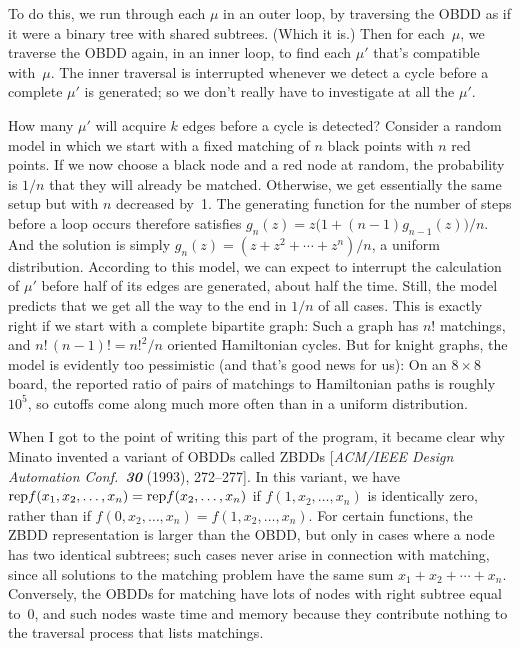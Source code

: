 To do this, we run through each $\mu$ in an outer loop, by traversing the OBDD
as if it were a binary tree with shared subtrees. (Which it is.) Then for
each~$\mu$, we traverse the OBDD again, in an inner loop, to find each $\mu'$
that's compatible with~$\mu$. The inner traversal is interrupted whenever we
detect a cycle before a complete $\mu'$ is generated; so we don't really have
to investigate at all the $\mu'$.

How many $\mu'$ will acquire $k$ edges before a cycle is detected? Consider a
random model in which we start with a fixed matching of $n$ black points with
$n$ red points. If we now choose a black node and a red node at random, the
probability is $1/n$ that they will already be matched. Otherwise, we get
essentially the same setup but with $n$ decreased by~1. The generating
function for the number of steps before a loop occurs therefore satisfies
$g_n(z)=z\bigl(1+(n-1)g_{n-1}(z)\bigr)/n$. And the solution is simply
$g_n(z)=(z+z^2+\cdots+z^n)/n$, a uniform distribution. According to this
model, we can expect to interrupt the calculation of $\mu'$ before half of its
edges are generated, about half the time. Still, the model predicts that we
get all the way to the end in $1/n$ of all cases. This is exactly right if we
start with a complete bipartite graph: Such a graph has $n!$ matchings, and
$n!\,(n-1)!=n!^2/n$ oriented Hamiltonian cycles. But for knight graphs, the
model is evidently too pessimistic (and that's good news for us): On an
$8\times8$ board, the reported ratio of pairs of matchings to Hamiltonian
paths is roughly $10^5$, so cutoffs come along much more often than in a
uniform distribution.

\fi

When I got to the point of writing this part of the program,
it became clear
why Minato invented a variant of OBDDs called ZBDDs [{\sl ACM/IEEE Design
Automation Conf.\ \bf30} (1993), 272--277]. In this variant, we have
$\hbox{rep} f(x_1,x_2,\ldots,x_n)=\hbox{rep} f(x_2,\ldots,x_n)$ if $f(1,x_2,\ldots,x_n)$
is identically zero, rather than if $f(0,x_2,\ldots,x_n)=f(1,x_2,\ldots,x_n)$.
For certain functions, the ZBDD representation is larger than the OBDD,
but only in cases where a node has two identical subtrees; such cases never
arise in connection with matching, since all solutions to the matching problem
have the same sum $x_1+x_2+\cdots+x_n$. Conversely, the OBDDs for matching
have lots of nodes with right subtree equal to~0, and such nodes waste time
and memory because they contribute nothing to the traversal process that lists
matchings.

